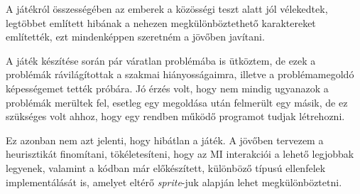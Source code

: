 \documentclass[
]{thesis-ekf}
\theoremstyle{definition}
\theoremstyle{remark}
\begin{document}
A játékról összességében az emberek a közösségi teszt alatt jól vélekedtek, legtöbbet említett hibának a nehezen megkülönböztethető karaktereket említették, ezt mindenképpen szeretném a jövőben javítani.

A játék készítése során pár váratlan problémába is ütköztem, de ezek a problémák rávilágítottak a szakmai hiányosságaimra, illetve a problémamegoldó képességemet tették próbára. Jó érzés volt, hogy nem mindig ugyanazok a problémák merültek fel, esetleg egy megoldása után felmerült egy másik, de ez szükséges volt ahhoz, hogy egy rendben működő programot tudjak létrehozni.

Ez azonban nem azt jelenti, hogy hibátlan a játék. A jövőben tervezem a heurisztikát finomítani, tökéletesíteni, hogy az MI interakciói a lehető legjobbak legyenek, valamint a kódban már előkészített, különböző típusú ellenfelek implementálását is, amelyet eltérő \emph{sprite}-juk alapján lehet megkülönböztetni.
\end{document}
